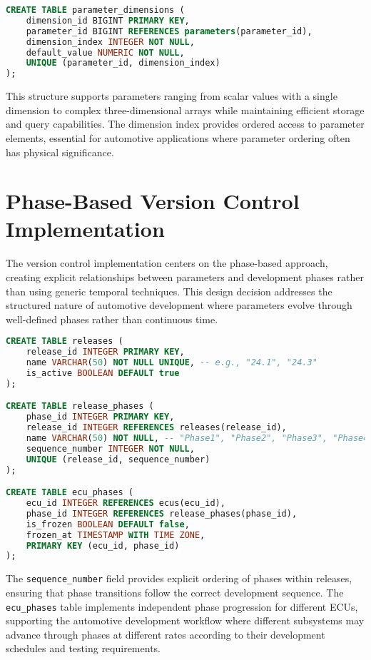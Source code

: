 \begin{lstlisting}[language=SQL, caption={Multi-Dimensional Parameter Structure}, label={lst:multi-dimensional}]
CREATE TABLE parameter_dimensions (
    dimension_id BIGINT PRIMARY KEY,
    parameter_id BIGINT REFERENCES parameters(parameter_id),
    dimension_index INTEGER NOT NULL,
    default_value NUMERIC NOT NULL,
    UNIQUE (parameter_id, dimension_index)
);
\end{lstlisting}

This structure supports parameters ranging from scalar values with a single dimension to complex three-dimensional arrays while maintaining efficient storage and query capabilities. The dimension index provides ordered access to parameter elements, essential for automotive applications where parameter ordering often has physical significance.

\section{Phase-Based Version Control Implementation}
\label{sec:phase-version-control}

The version control implementation centers on the phase-based approach, creating explicit relationships between parameters and development phases rather than using generic temporal techniques. This design decision addresses the structured nature of automotive development where parameters evolve through well-defined phases rather than continuous time.

\begin{lstlisting}[language=SQL, caption={Phase-Based Version Control Structure}, label={lst:phase-structure}]
CREATE TABLE releases (
    release_id INTEGER PRIMARY KEY,
    name VARCHAR(50) NOT NULL UNIQUE, -- e.g., "24.1", "24.3"
    is_active BOOLEAN DEFAULT true
);

CREATE TABLE release_phases (
    phase_id INTEGER PRIMARY KEY,
    release_id INTEGER REFERENCES releases(release_id),
    name VARCHAR(50) NOT NULL, -- "Phase1", "Phase2", "Phase3", "Phase4"
    sequence_number INTEGER NOT NULL,
    UNIQUE (release_id, sequence_number)
);

CREATE TABLE ecu_phases (
    ecu_id INTEGER REFERENCES ecus(ecu_id),
    phase_id INTEGER REFERENCES release_phases(phase_id),
    is_frozen BOOLEAN DEFAULT false,
    frozen_at TIMESTAMP WITH TIME ZONE,
    PRIMARY KEY (ecu_id, phase_id)
);
\end{lstlisting}

The \texttt{sequence\_number} field provides explicit ordering of phases within releases, ensuring that phase transitions follow the correct development sequence. The \texttt{ecu\_phases} table implements independent phase progression for different ECUs, supporting the automotive development workflow where different subsystems may advance through phases at different rates according to their development schedules and testing requirements.

